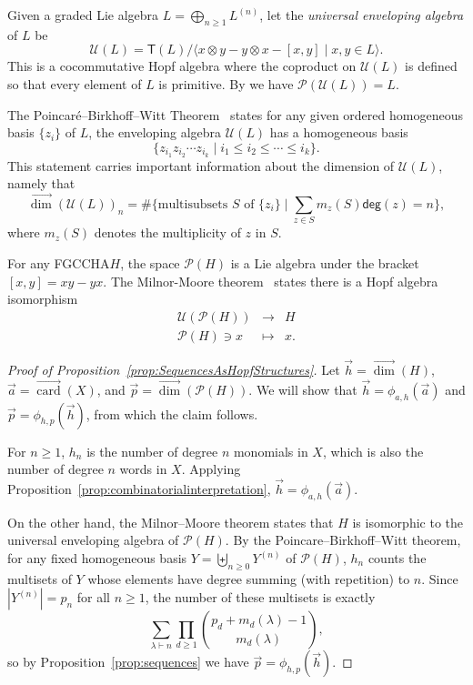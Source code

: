 \documentclass[11pt]{amsart}
\theoremstyle{definition}
\numberwithin{equation}{section}
\newcommand{\FGCCHA}{\textsf{FGCCHA}\xspace}
\newcommand{\vecdim}{\overrightarrow{\dim}}
\newcommand{\veccard}{\overrightarrow{\operatorname{card}}}
\begin{document}
Given a graded Lie algebra $L = \bigoplus_{n \ge 1} L^{(n)}$, let the \emph{universal enveloping algebra} of $L$ be
\[
\mathcal{U}(L) = \mathsf{T}(L) \big/ \big\langle x\otimes y - y \otimes x - [x, y] \;|\; \text{$x, y \in L$} \big\rangle.
\]
This is a cocommutative Hopf algebra where the coproduct on $\mathcal{U}(L)$ is defined so that every element of $L$ is primitive.  By \cite[Theorem 1.4]{Reutenauer-FreeLieAlgebras} we have $\mathcal{P}(\mathcal{U}(L))=L$.  

The Poincar\'{e}--Birkhoff--Witt Theorem~\cite[\S 0.1]{Reutenauer-FreeLieAlgebras}
states for any given ordered homogeneous basis $\{z_i\}$ of $L$,
the enveloping algebra $\mathcal{U}(L)$ has a homogeneous basis
\[
\{ z_{i_1}z_{i_2}\cdots z_{i_k} \;|\; i_1 \leq i_2 \leq \cdots \leq i_k\}.
\]
This statement carries important information about the dimension of $\mathcal{U}(L)$, namely that 
\[
\vecdim(\mathcal{U}(L))_{n}= \#\{\text{multisubsets $S$ of $\{z_{i}\}$} \;|\; \sum_{z \in S} m_{z}(S) \mathsf{deg}(z) = n\},
\]
where $m_{z}(S)$ denotes the multiplicity of $z$ in $S$.

For any \FGCCHA $H$, the space $\mathcal{P}(H)$ is a Lie algebra under the bracket $[x, y] = xy - yx$.  
The Milnor-Moore theorem~\cite[Theorem 5.18]{MM65} states there is a Hopf algebra isomorphism
\[
\begin{array}{rcl}
\mathcal{U}(\mathcal{P}(H)) &\to& H \\
\mathcal{P}(H) \ni x & \mapsto&  x.
\end{array}
\]

\begin{proof}[Proof of Proposition~\ref{prop:SequencesAsHopfStructures}]
Let $\vec{h} = \vecdim(H)$, $\vec{a} = \veccard(X)$, and $\vec{p} = \vecdim(\mathcal{P}(H))$.  We will show that $\vec{h} = \phi_{a, h}(\vec{a})$ and $\vec{p} = \phi_{h, p}(\vec{h})$, from which the claim follows.  

For $n \ge 1$, $h_{n}$ is the number of degree $n$ monomials in $X$, which is also the number of degree $n$ words in $X$.  
Applying Proposition~\ref{prop:combinatorialinterpretation}, $\vec{h} = \phi_{a, h}(\vec{a})$.

On the other hand, the Milnor--Moore theorem states that $H$ is
isomorphic to the universal enveloping algebra of $\mathcal{P}(H)$.
By the Poincare--Birkhoff--Witt theorem, for any fixed homogeneous basis
$Y = \biguplus_{n \ge 0} Y^{(n)}$ of $\mathcal{P}(H)$, $h_{n}$ counts
the multisets of $Y$ whose elements have degree summing (with repetition)
to $n$.  Since $|Y^{(n)}| = p_{n}$ for all $n \ge 1$, the number of these
multisets is exactly
\[
\sum_{\lambda \vdash n} \prod_{d \geq 1} \binom{p_d + m_d(\lambda) -1}{m_d(\lambda)},
\]
so by Proposition~\ref{prop:sequences} we have $\vec{p} = \phi_{h, p}(\vec{h})$.
\end{proof}
\end{document}
